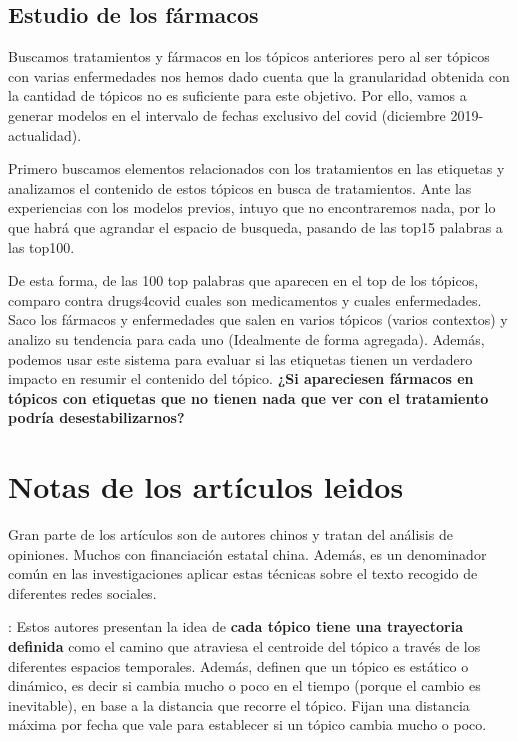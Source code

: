 \documentclass[a4paper,10pt]{article}
\begin{document}
\subsection{Estudio de los fármacos}
Buscamos tratamientos y fármacos en los tópicos anteriores pero al ser tópicos con varias enfermedades nos hemos dado cuenta que la granularidad obtenida con la cantidad de tópicos no es suficiente para este objetivo. Por ello, vamos a generar modelos en el intervalo de fechas exclusivo del covid (diciembre 2019-actualidad).

Primero buscamos elementos relacionados con los tratamientos en las etiquetas y analizamos el contenido de estos tópicos en busca de tratamientos. Ante las experiencias con los modelos previos, intuyo que no encontraremos nada, por lo que habrá que agrandar el espacio de busqueda, pasando de las top15 palabras a las top100.

De esta forma, de las 100 top palabras que aparecen en el top de los tópicos, comparo contra drugs4covid cuales son medicamentos y cuales enfermedades. Saco los fármacos y enfermedades que salen en varios tópicos (varios contextos) y analizo su tendencia para cada uno (Idealmente de forma agregada). Además, podemos usar este sistema para evaluar si las etiquetas tienen un verdadero impacto en resumir el contenido del tópico. \textbf{¿Si apareciesen fármacos en tópicos con etiquetas que no tienen nada que ver con el tratamiento podría desestabilizarnos?} 


\newpage
\section{Notas de los artículos leidos}

Gran parte de los artículos son de autores chinos y tratan del análisis de opiniones. Muchos con financiación estatal china. Además, es un denominador común en las investigaciones aplicar estas técnicas sobre el texto recogido de diferentes redes sociales.

\cite{Yao2020}: Estos autores presentan la idea de \textbf{cada tópico tiene una trayectoria definida} como el camino que atraviesa el centroide del tópico a través de los diferentes espacios temporales. Además, definen que un tópico es estático o dinámico, es decir si cambia mucho o poco en el tiempo (porque el cambio es inevitable), en base a la distancia que recorre el tópico. Fijan una distancia máxima por fecha que vale para establecer si un tópico cambia mucho o poco.
\end{document}
